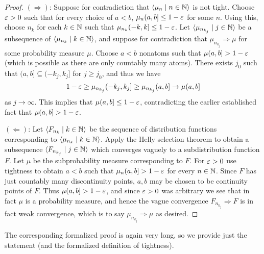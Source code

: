 \documentclass[leqno]{article}
\theoremstyle{definition}
\newcommand{\bldseq}[2]{\langle{#1}\mid{#2}\rangle}
\begin{document}
\begin{proof}
$(\Longrightarrow)$: Suppose for contradiction that $\bldseq{\mu_n}{n \in \N}$ is not tight. Choose $\varepsilon > 0$ such that for every choice of $a < b$, $\mu_n (a,b] \le 1 - \varepsilon$ for some $n$. Using this, choose $n_k$ for each $k \in \mathbb{N}$ such that $\mu_{n_k} (-k,k] \le 1 - \varepsilon$. Let $\bldseq{\mu_{n_{k_j}}}{j \in \N}$ be a subsequence of $\bldseq{\mu_{n_k}}{k \in \N}$, and suppose for contradiction that $\mu_{n_{k_j}} \Rightarrow \mu$ for some probability measure $\mu$. Choose $a < b$ nonatoms such that $\mu (a,b] > 1 - \varepsilon$ (which is possible as there are only countably many atoms). There exists $j_0$ such that $(a,b] \subseteq (-k_j, k_j]$ for $j \ge j_0$, and thus we have
\[ 1 - \varepsilon \ge \mu_{n_{k_j}} (-k_j, k_j] \ge \mu_{n_{k_j}} (a,b] \rightarrow \mu (a,b] \]
as $j \rightarrow \infty$. This implies that $\mu (a,b] \le 1 - \varepsilon$, contradicting the earlier established fact that $\mu (a,b] > 1 - \varepsilon$.

$(\Longleftarrow)$: Let $\bldseq{F_{n_k}}{k \in \N}$ be the sequence of distribution functions corresponding to $\bldseq{\mu_{n_k}}{k \in \N}$. Apply the Helly selection theorem to obtain a subsequence $\bldseq{F_{n_{k_j}}}{j \in \N}$ which converges vaguely to a subdistribution function $F$. Let $\mu$ be the subprobability measure corresponding to $F$. For $\varepsilon > 0$ use tightness to obtain $a < b$ such that $\mu_n (a,b] > 1 - \varepsilon$ for every $n \in \mathbb{N}$. Since $F$ has just countably many discontinuity points, $a,b$ may be chosen to be continuity points of $F$. Thus $\mu (a,b] > 1 - \varepsilon$, and since $\varepsilon > 0$ was arbitrary we see that in fact $\mu$ is a probability measure, and hence the vague convergence $F_{n_{k_j}} \Rightarrow F$ is in fact weak convergence, which is to say $\mu_{n_{k_j}} \Rightarrow \mu$ as desired.
\end{proof}

The corresponding formalized proof is again very long, so we provide just the statement (and the formalized definition of tightness).

\medskip
\end{document}
